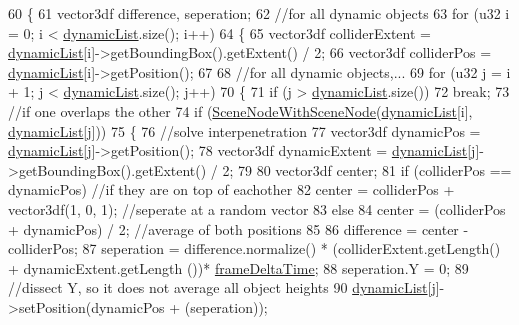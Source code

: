 \begin{DoxyCode}
60 \{
61     vector3df difference, seperation;
62     \textcolor{comment}{//for all dynamic objects}
63     \textcolor{keywordflow}{for} (u32 i = 0; i < \hyperlink{_collision_8cpp_a879d8cc6abaabd771309fa0b6ef5c3ef}{dynamicList}.size(); i++)
64     \{
65         vector3df colliderExtent = \hyperlink{_collision_8cpp_a879d8cc6abaabd771309fa0b6ef5c3ef}{dynamicList}[i]->getBoundingBox().getExtent() / 2;
66         vector3df colliderPos = \hyperlink{_collision_8cpp_a879d8cc6abaabd771309fa0b6ef5c3ef}{dynamicList}[i]->getPosition();
67 
68         \textcolor{comment}{//for all dynamic objects,...}
69         \textcolor{keywordflow}{for} (u32 j = i + 1; j < \hyperlink{_collision_8cpp_a879d8cc6abaabd771309fa0b6ef5c3ef}{dynamicList}.size(); j++)
70         \{
71             \textcolor{keywordflow}{if} (j > \hyperlink{_collision_8cpp_a879d8cc6abaabd771309fa0b6ef5c3ef}{dynamicList}.size())
72                 \textcolor{keywordflow}{break};
73             \textcolor{comment}{//if one overlaps the other}
74             \textcolor{keywordflow}{if} (\hyperlink{class_collision_aa2fa3418899ac7948b31eb909dea6f04}{SceneNodeWithSceneNode}(\hyperlink{_collision_8cpp_a879d8cc6abaabd771309fa0b6ef5c3ef}{dynamicList}[i], 
      \hyperlink{_collision_8cpp_a879d8cc6abaabd771309fa0b6ef5c3ef}{dynamicList}[j]))
75             \{
76                 \textcolor{comment}{//solve interpenetration}
77                 vector3df dynamicPos = \hyperlink{_collision_8cpp_a879d8cc6abaabd771309fa0b6ef5c3ef}{dynamicList}[j]->getPosition();
78                 vector3df dynamicExtent = \hyperlink{_collision_8cpp_a879d8cc6abaabd771309fa0b6ef5c3ef}{dynamicList}[j]->getBoundingBox().getExtent() / 2;
79 
80                 vector3df center;
81                 \textcolor{keywordflow}{if} (colliderPos == dynamicPos) \textcolor{comment}{//if they are on top of eachother}
82                     center = colliderPos + vector3df(1, 0, 1); \textcolor{comment}{//seperate at a random vector}
83                 \textcolor{keywordflow}{else}
84                     center = (colliderPos + dynamicPos) / 2; \textcolor{comment}{//average of both positions}
85 
86                 difference = center - colliderPos;
87                 seperation = difference.normalize() * (colliderExtent.getLength() + dynamicExtent.getLength
      ())* \hyperlink{_player_8cpp_adc988571147642cda93afbf89783f9c9}{frameDeltaTime};
88                 seperation.Y = 0;
89                 \textcolor{comment}{//dissect Y, so it does not average all object heights}
90                 \hyperlink{_collision_8cpp_a879d8cc6abaabd771309fa0b6ef5c3ef}{dynamicList}[j]->setPosition(dynamicPos + (seperation));

\end{DoxyCode}
